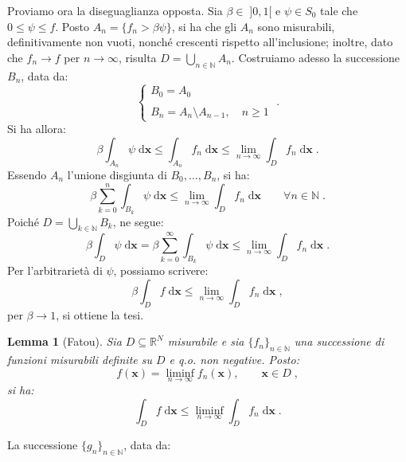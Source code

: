 \documentclass[a4paper,12pt]{report}
\theoremstyle{plain}
\newtheorem{lem}{Lemma}[section]
\theoremstyle{definition}
\theoremstyle{remark}
\newcommand{\diff}[1]{\mathrm{d}#1}
\numberwithin{equation}{section}
\begin{document}
Proviamo ora la diseguaglianza opposta. Sia $\beta\in\;]0,1[$ e $\psi\in S_0$ tale che $0\le\psi\le f$. Posto $A_n=\{f_n>\beta\psi\}$, si
 ha che gli $A_n$ sono misurabili, definitivamente non vuoti, nonché crescenti rispetto all'inclusione; inoltre, dato che $f_n \to f$ per
$n\to \infty$, risulta $D=\bigcup_{n\in\mathbb{N}} A_n$. Costruiamo adesso la successione $B_n$, data da:
\begin{equation}
\begin{cases}
 B_0=A_0 \\
\\
B_n=A_n\setminus A_{n-1}, \quad n\ge 1
\end{cases}\;.
\end{equation}
Si ha allora:
\begin{equation}
\beta\int_{A_n}\psi\;\diff{\mathbf{x}}\le \int_{A_n}f_n\;\diff{\mathbf{x}}\le \lim_{n\to\infty}\int_D f_n\;\diff{\mathbf{x}}\;.
\end{equation}
Essendo $A_n$ l'unione disgiunta di $B_0,\ldots,B_n$, si ha:
\begin{equation}
\beta\sum_{k=0}^n\int_{B_k} \psi\;\diff{\mathbf{x}}\le \lim_{n\to \infty}\int_D f_n\;\diff{\mathbf{x}} \qquad \forall n\in \mathbb{N}\;.
\end{equation}
Poiché $D=\bigcup_{k\in\mathbb{N}}B_k$, ne segue:
\begin{equation}
\beta\int_D \psi\;\diff{\mathbf{x}}=\beta\sum_{k=0}^{\infty}\int_{B_k}\psi\;\diff{\mathbf{x}}\le \lim_{n\to\infty}\int_D f_n\;\diff{\mathbf{x}}\;.
\end{equation}
Per l'arbitrarietà di $\psi$, possiamo scrivere:
\begin{equation}
\beta\int_D f\;\diff{\mathbf{x}} \le \lim_{n\to\infty}\int_D f_n\;\diff{\mathbf{x}}\;,
\end{equation}
per $\beta\to 1$, si ottiene la tesi.
\endproof
\begin{lem}[Fatou] Sia $D\subseteq \mathbb{R}^N$ misurabile e sia $\{f_n\}_{n\in\mathbb{N}}$ una successione di funzioni misurabili definite su $D$ e q.o. non negative. Posto:
\begin{equation}
f(\mathbf{x})=\liminf_{n\to\infty} f_n(\mathbf{x}),\qquad \mathbf{x}\in D\;,
\end{equation}
si ha:
\begin{equation}
\int_D f\;\diff{\mathbf{x}}\le \liminf_{n\to \infty}\int_D f_n\;\diff{\mathbf{x}}\;.
\end{equation}
\end{lem}
\proof La successione $\{g_n\}_{n\in\mathbb{N}}$, data da:
\end{document}
